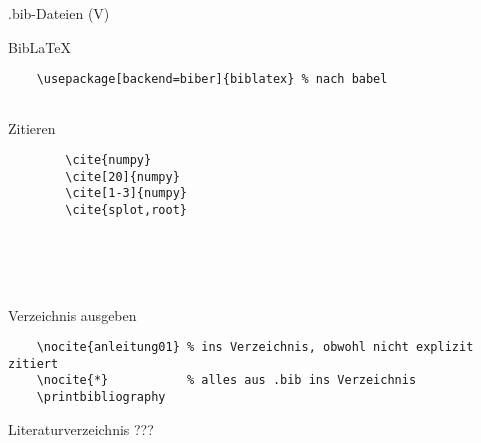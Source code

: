 \begin{frame}{.bib-Dateien (V)}
  \bibexamplev
\end{frame}

\begin{frame}[fragile]{Bib\LaTeX\hfill{}}
  \begin{Packages}
    \begin{lstlisting}
    \usepackage[backend=biber]{biblatex} % nach babel
    
    \end{lstlisting}
  \end{Packages}
  \begin{block}{Zitieren}
      \begin{minipage}{0.6\linewidth}
        \begin{lstlisting}
        \cite{numpy}
        \cite[20]{numpy}
        \cite[1-3]{numpy}
        \cite{splot,root}
        \end{lstlisting}
      \end{minipage}
      \begin{minipage}{0.35\linewidth}
        \cite{numpy}\\
        \cite[20]{numpy}\\
        \cite[1-3]{numpy}\\
        \cite{splot,root}
      \end{minipage}
  \end{block}
  \begin{block}{Verzeichnis ausgeben}
    \begin{lstlisting}
    \nocite{anleitung01} % ins Verzeichnis, obwohl nicht explizit zitiert
    \nocite{*}           % alles aus .bib ins Verzeichnis
    \printbibliography
    \end{lstlisting}
  \end{block}
\end{frame}

\begin{frame}{Literaturverzeichnis}
  \centering
  \pause
  \Huge ???
\end{frame}

